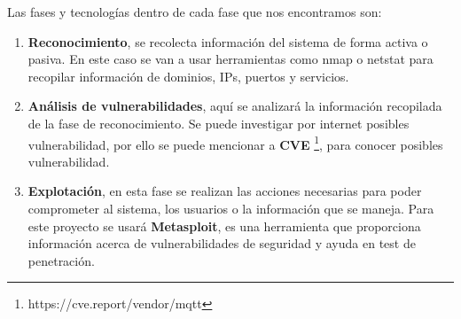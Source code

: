 {Las fases y tecnologías dentro de cada fase que nos encontramos son:

\begin{enumerate}
    \item \textbf{Reconocimiento}, se recolecta información del sistema de forma activa o pasiva. En este caso se van a usar herramientas como nmap o netstat para recopilar información de dominios, IPs, puertos y servicios.
    \item \textbf{Análisis de vulnerabilidades}, aquí se analizará la información recopilada de la fase de reconocimiento. Se puede investigar por internet posibles vulnerabilidad, por ello se puede mencionar a \textbf{CVE} \footnote{https://cve.report/vendor/mqtt}, para conocer posibles vulnerabilidad.
    \item \textbf{Explotación}, en esta fase se realizan las acciones necesarias para poder comprometer al sistema, los usuarios o la información que se maneja. Para este proyecto se usará \textbf{Metasploit}, es una herramienta que proporciona información acerca de vulnerabilidades de seguridad y ayuda en test de penetración.
\end{enumerate}


}